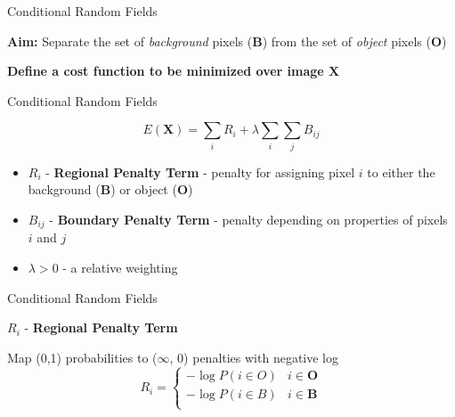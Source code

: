 \documentclass[10pt]{beamer}
\begin{document}
\begin{frame}[fragile]{Conditional Random Fields}

    \textbf{Aim:} Separate the set of \textit{background} pixels (\textbf{B}) from the set of \textit{object} pixels (\textbf{O})
  
    \textbf{Define a cost function to be minimized over image $\mathbf{X}$}
\end{frame}


\begin{frame}[fragile]{Conditional Random Fields}

    \begin{equation}
      E(\mathbf{X}) = \sum_{i} R_{i} + \lambda \sum_{i} \sum_{j} B_{ij}
      \label{eq:costFunc}
    \end{equation}

    \begin{itemize}
    \item $R_{i}$ - \textbf{Regional Penalty Term} - penalty for assigning pixel $i$ to either the background (\textbf{B}) or object (\textbf{O})
    \item $B_{ij}$ - \textbf{Boundary Penalty Term} - penalty depending on properties of pixels $i$ and $j$
    \item $\lambda > 0$ - a relative weighting
    \end{itemize}
    
\end{frame}


\begin{frame}[fragile]{Conditional Random Fields}

  $R_{i}$ - \textbf{Regional Penalty Term}

  Map (0,1) probabilities to ($\infty$, 0) penalties with negative log
  \pause  
  \begin{equation} R_{i} = \begin{cases} 
      -\log P(i \in O) & i \in \mathbf{O} \\
      -\log P(i \in B) & i \in \mathbf{B} \\
   \end{cases}
  \end{equation}
    
\end{frame}
\end{document}
